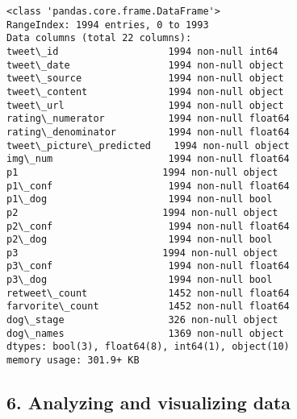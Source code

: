 \documentclass[11pt]{article}
\begin{document}
    \begin{Verbatim}[commandchars=\\\{\}]
<class 'pandas.core.frame.DataFrame'>
RangeIndex: 1994 entries, 0 to 1993
Data columns (total 22 columns):
tweet\_id                   1994 non-null int64
tweet\_date                 1994 non-null object
tweet\_source               1994 non-null object
tweet\_content              1994 non-null object
tweet\_url                  1994 non-null object
rating\_numerator           1994 non-null float64
rating\_denominator         1994 non-null float64
tweet\_picture\_predicted    1994 non-null object
img\_num                    1994 non-null float64
p1                         1994 non-null object
p1\_conf                    1994 non-null float64
p1\_dog                     1994 non-null bool
p2                         1994 non-null object
p2\_conf                    1994 non-null float64
p2\_dog                     1994 non-null bool
p3                         1994 non-null object
p3\_conf                    1994 non-null float64
p3\_dog                     1994 non-null bool
retweet\_count              1452 non-null float64
farvorite\_count            1452 non-null float64
dog\_stage                  326 non-null object
dog\_names                  1369 non-null object
dtypes: bool(3), float64(8), int64(1), object(10)
memory usage: 301.9+ KB

    \end{Verbatim}

    \hypertarget{analyzing-and-visualizing-data}{%
\subsection{6. Analyzing and visualizing
data}\label{analyzing-and-visualizing-data}}
\end{document}
